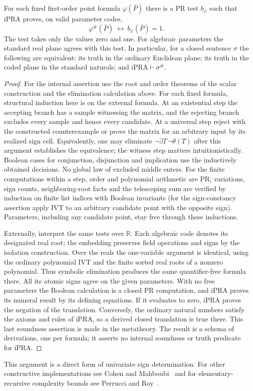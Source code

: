 \begin{theorem}
\label{thm:transfer}
For each fixed first-order point formula $\varphi(\bar P)$ there is
a PR test $b_\varphi$ such that iPRA proves, on valid parameter codes,
\[
                  \varphi^\#(\bar P)\ \longleftrightarrow\
                  b_\varphi(\bar P)=1 .
\]
The test takes only the values zero and one. For algebraic parameters
the standard real plane agrees with this test. In particular, for a
closed sentence $\sigma$ the following are equivalent: its truth in
the ordinary Euclidean plane; its truth in the coded plane in the
standard naturals; and $\mathrm{iPRA}\vdash\sigma^\#$.
\end{theorem}
\begin{proof}
For the internal assertion use the root and order theorems of the scalar
construction and the elimination calculation above. For each fixed formula,
structural induction here is on the external formula. At an existential
step the accepting branch has a sample witnessing the matrix, and the
rejecting branch excludes every sample and hence every candidate. At a
universal step reject with the constructed counterexample or prove the
matrix for an arbitrary input by its realized sign cell. Equivalently,
one may eliminate $\neg\exists T\,\neg\theta(T)$ after this argument
establishes the equivalence; the witness step matters intuitionistically.
Boolean cases for conjunction, disjunction and implication use the
inductively obtained decisions. No global law of excluded middle enters.
For the finite computations within a step, order and polynomial arithmetic
are PR; variations, sign counts, neighboring-root facts and the telescoping
sum are verified by induction on finite list indices with Boolean
invariants (for the sign-constancy assertion apply IVT to an arbitrary
candidate point with the opposite sign). Parameters, including any
candidate point, stay free through these inductions.

Externally, interpret the same tests over $\mathbb R$. Each algebraic
code denotes its designated real root; the embedding preserves field
operations and signs by the isolation construction. Over the reals the
one-variable argument is identical, using the ordinary polynomial IVT
and the finite sorted real roots of a nonzero polynomial. Thus symbolic
elimination produces the same quantifier-free formula there. All its
atomic signs agree on the given parameters. With no free parameters the
Boolean calculation is a closed PR computation, and iPRA proves its
numeral result by its defining equations. If it evaluates to zero,
iPRA proves the negation of the translation. Conversely, the ordinary
natural numbers satisfy the axioms and rules of iPRA, so a derived
closed translation is true there. This last soundness assertion is made
in the metatheory. The result is a schema of derivations, one per formula;
it asserts no internal soundness or truth predicate for iPRA.
\end{proof}
\noindent
This argument is a direct form of univariate sign determination. For other
constructive implementations see Cohen and Mahboubi~\cite{cm} and for
elementary-recursive complexity bounds see Perrucci and Roy~\cite{pr}.

